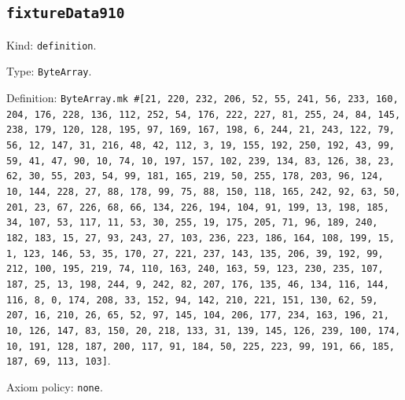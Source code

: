 \documentclass[11pt]{article}
\begin{document}
\subsection*{\texttt{fixtureData910}}
\noindent Kind: \texttt{definition}.\par
\noindent Type: \texttt{ByteArray}.\par
\noindent Definition: \texttt{ByteArray.mk \#[21, 220, 232, 206, 52, 55, 241, 56, 233, 160, 204, 176, 228, 136, 112, 252, 54, 176, 222, 227, 81, 255, 24, 84, 145, 238, 179, 120, 128, 195, 97, 169, 167, 198, 6, 244, 21, 243, 122, 79, 56, 12, 147, 31, 216, 48, 42, 112, 3, 19, 155, 192, 250, 192, 43, 99, 59, 41, 47, 90, 10, 74, 10, 197, 157, 102, 239, 134, 83, 126, 38, 23, 62, 30, 55, 203, 54, 99, 181, 165, 219, 50, 255, 178, 203, 96, 124, 10, 144, 228, 27, 88, 178, 99, 75, 88, 150, 118, 165, 242, 92, 63, 50, 201, 23, 67, 226, 68, 66, 134, 226, 194, 104, 91, 199, 13, 198, 185, 34, 107, 53, 117, 11, 53, 30, 255, 19, 175, 205, 71, 96, 189, 240, 182, 183, 15, 27, 93, 243, 27, 103, 236, 223, 186, 164, 108, 199, 15, 1, 123, 146, 53, 35, 170, 27, 221, 237, 143, 135, 206, 39, 192, 99, 212, 100, 195, 219, 74, 110, 163, 240, 163, 59, 123, 230, 235, 107, 187, 25, 13, 198, 244, 9, 242, 82, 207, 176, 135, 46, 134, 116, 144, 116, 8, 0, 174, 208, 33, 152, 94, 142, 210, 221, 151, 130, 62, 59, 207, 16, 210, 26, 65, 52, 97, 145, 104, 206, 177, 234, 163, 196, 21, 10, 126, 147, 83, 150, 20, 218, 133, 31, 139, 145, 126, 239, 100, 174, 10, 191, 128, 187, 200, 117, 91, 184, 50, 225, 223, 99, 191, 66, 185, 187, 69, 113, 103]}.\par
\noindent Axiom policy: \texttt{none}.\par
\end{document}
